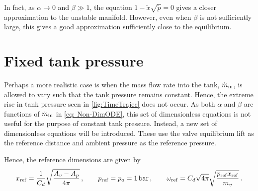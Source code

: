 In fact, as $\alpha \rightarrow 0$ and $\beta \gg 1$, the equation $1 - \tilde{x} \sqrt{\tilde{p}} = 0$ gives a closer approximation to the unstable manifold. However, even when $\beta$ is not sufficiently large, this gives a good approximation sufficiently close to the equilibrium.

% 

\section{Fixed tank pressure} \label{sec: ClosingFixPres}

Perhaps a more realistic case is when the mass flow rate into the tank, $\dot{m}_{\rm{in}}$, is allowed to vary such that the tank pressure remains constant. Hence, the extreme rise in tank pressure seen in \cref{fig:TimeTrajec} does not occur. As both $\alpha$ and $\beta$ are functions of $\dot{m}_{\rm{in}}$ in \cref{eq: Non-DimODE}, this set of dimensionless equations is not useful for the purpose of constant tank pressure. Instead, a new set of dimensionless equations will be introduced. These use the valve equilibrium lift as the reference distance and ambient pressure as the reference pressure.

Hence, the reference dimensions are given by
~
\begin{equation*}
\begin{split}
    x_{\rm{ref}} = \frac{1}{C_d} \sqrt{\frac{A_v - A_p}{4 \pi}}
    \, , \qquad
    p_{\rm{ref}} = p_a = 1 \, \si{bar}
    \, , \qquad
    \omega_{\rm{ref}} = C_d \sqrt{4 \pi} \sqrt{\frac{p_{\rm{ref}} x_{\rm{ref}}}{m_v}} \, .
\end{split}
\end{equation*}

